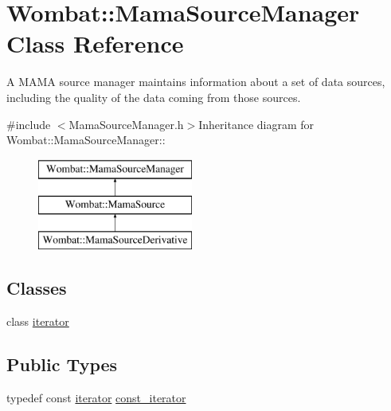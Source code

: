 \hypertarget{classWombat_1_1MamaSourceManager}{
\section{Wombat::MamaSourceManager Class Reference}
\label{classWombat_1_1MamaSourceManager}
}


A MAMA source manager maintains information about a set of data sources, including the quality of the data coming from those sources.  


{\ttfamily \#include $<$MamaSourceManager.h$>$}Inheritance diagram for Wombat::MamaSourceManager::\begin{figure}[H]
\begin{center}
\leavevmode
\includegraphics[height=3cm]{classWombat_1_1MamaSourceManager}
\end{center}
\end{figure}
\subsection*{Classes}
\begin{DoxyCompactItemize}
\item 
class \hyperlink{classWombat_1_1MamaSourceManager_1_1iterator}{iterator}
\end{DoxyCompactItemize}
\subsection*{Public Types}
\begin{DoxyCompactItemize}
\item 
typedef const \hyperlink{classWombat_1_1MamaSourceManager_1_1iterator}{iterator} \hyperlink{classWombat_1_1MamaSourceManager_a3b80b1f2c1dc79abc9d8b77e839a613c}{const\_\-iterator}
\end{DoxyCompactItemize}
